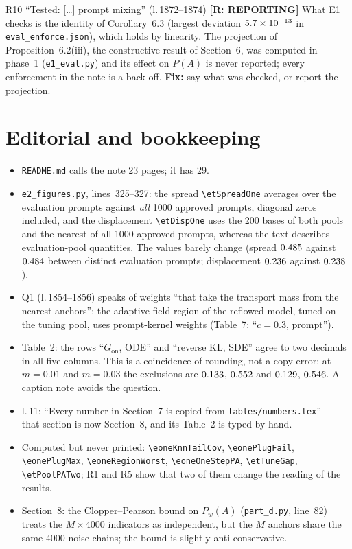 \documentclass[11pt]{article}
\newcommand{\file}[1]{\texttt{#1}}
\newcommand{\lin}[1]{l.\,#1}
\newcommand{\mac}[1]{\texttt{\textbackslash #1}}
\newcommand{\badge}[2]{\textcolor{#1}{\textbf{[#2]}}}
\newcommand{\Srep}{\badge{warnOr}{R: REPORTING}}
\begin{document}
\begin{findbox}{R10 \quad ``Tested: [\dots] prompt mixing'' (\lin{1872--1874}) \hfill \Srep}
What E1 checks is the identity of Corollary~6.3 (largest deviation $5.7\times10^{-13}$ in \file{eval\_enforce.json}), which holds by
linearity. The projection of Proposition~6.2(iii), the constructive result of Section~6, was computed in phase~1
(\file{e1\_eval.py}) and its effect on $P(A)$ is never reported; every enforcement in the note is a back-off. \textbf{Fix:} say what was
checked, or report the projection.
\end{findbox}

\section{Editorial and bookkeeping}\label{sec:edit}
\begingroup\sloppy
\begin{itemize}[leftmargin=1.6em,itemsep=2pt,topsep=2pt]
\item[H1] \file{README.md} calls the note 23 pages; it has 29.
\item[H2] \file{e2\_figures.py}, lines~325--327: the spread \mac{etSpreadOne} averages over the evaluation prompts against \emph{all}
1000 approved prompts, diagonal zeros included, and the displacement \mac{etDispOne} uses the 200 bases of both pools and the
nearest of all 1000 approved prompts, whereas the text describes evaluation-pool quantities. The values barely change
(spread $0.485$ against $0.484$ between distinct evaluation prompts; displacement $0.236$ against $0.238$).
\item[H3] Q1 (\lin{1854--1856}) speaks of weights ``that take the transport mass from the nearest anchors''; the adaptive field
region of the reflowed model, tuned on the tuning pool, uses prompt-kernel weights (Table~7: ``$c=0.3$, prompt'').
\item[H4] Table~2: the rows ``$G_{\mathrm{on}}$, ODE'' and ``reverse KL, SDE'' agree to two decimals in all five columns. This is a
coincidence of rounding, not a copy error: at $m=0.01$ and $m=0.03$ the exclusions are $0.133$, $0.552$ and $0.129$, $0.546$.
A caption note avoids the question.
\item[H5] \lin{11}: ``Every number in Section~7 is copied from \file{tables/numbers.tex}'' --- that section is now Section~8, and its
Table~2 is typed by hand.
\item[H6] Computed but never printed: \mac{eoneKnnTailCov}, \mac{eonePlugFail}, \mac{eonePlugMax}, \mac{eoneRegionWorst}, \mac{eoneOneStepPA},
\mac{etTuneGap}, \mac{etPoolPATwo}; R1 and R5 show that two of them change the reading of the results.
\item[H7] Section~8: the Clopper--Pearson bound on $\bar P_w(A)$ (\file{part\_d.py}, line~82) treats the $M\times4000$ indicators as
independent, but the $M$ anchors share the same 4000 noise chains; the bound is slightly anti-conservative.
\end{itemize}
\endgroup
\end{document}

